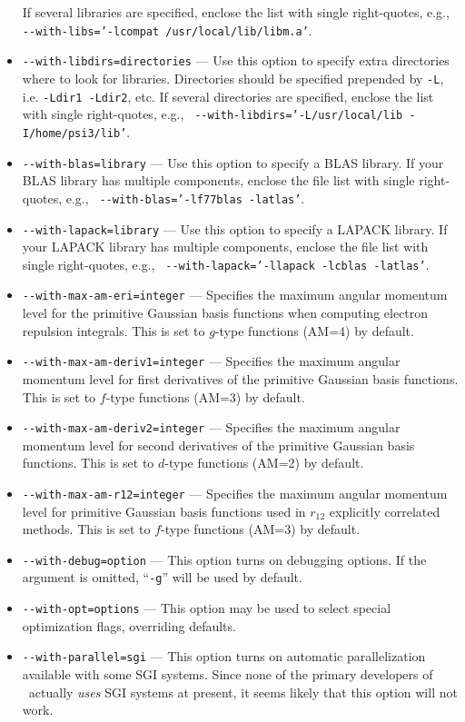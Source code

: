 \documentclass[12pt]{article}
\begin{document}
\begin{itemize}
  If several libraries are specified, enclose the list with single right-quotes, e.g., {\tt
  -}{\tt -with-libs='-lcompat /usr/local/lib/libm.a'}.
\item {\tt -}{\tt -with-libdirs=directories} --- Use this option to specify extra
  directories where to look for libraries. Directories should be specified
  prepended by {\tt -L}, i.e. {\tt -Ldir1 -Ldir2}, etc. If several directories are specified,
  enclose the list with single right-quotes, e.g., {\tt
  -}{\tt -with-libdirs='-L/usr/local/lib -I/home/psi3/lib'}.
\item {\tt -}{\tt -with-blas=library} --- Use this option to specify a BLAS
  library.  If your BLAS library has multiple components, enclose the
  file list with single right-quotes, e.g., {\tt
  -}{\tt -with-blas='-lf77blas -latlas'}.
\item {\tt -}{\tt -with-lapack=library} --- Use this option to specify a
  LAPACK library.  If your LAPACK library has multiple components,
  enclose the file list with single right-quotes, e.g., {\tt
  -}{\tt -with-lapack='-llapack -lcblas -latlas'}.
\item {\tt -}{\tt -with-max-am-eri=integer} --- Specifies the maximum
  angular momentum level for the primitive Gaussian basis functions
  when computing electron repulsion integrals.  This is set to
  $g$-type functions (AM=4) by default.
\item {\tt -}{\tt -with-max-am-deriv1=integer} --- Specifies the maximum
  angular momentum level for first derivatives of the primitive
  Gaussian basis functions.  This is set to $f$-type functions (AM=3)
  by default.
\item {\tt -}{\tt -with-max-am-deriv2=integer} --- Specifies the maximum
  angular momentum level for second derivatives of the primitive
  Gaussian basis functions.  This is set to $d$-type functions (AM=2)
  by default.
\item {\tt -}{\tt -with-max-am-r12=integer} --- Specifies the maximum
  angular momentum level for primitive Gaussian basis functions used
  in $r_{12}$ explicitly correlated methods.  This is set to $f$-type
  functions (AM=3) by default.
\item {\tt -}{\tt -with-debug=option} --- This option turns on debugging
  options.  If the argument is omitted, ``{\tt -g}'' will be used by default.
\item {\tt -}{\tt -with-opt=options} --- This option may be used to select
  special optimization flags, overriding defaults.
\item {\tt -}{\tt -with-parallel=sgi} --- This option turns on automatic
  parallelization available with some SGI systems.  Since none of the
  primary developers of \PSIthree\ actually {\em uses} SGI systems at
  present, it seems likely that this option will not work.
\end{itemize}
\end{document}
